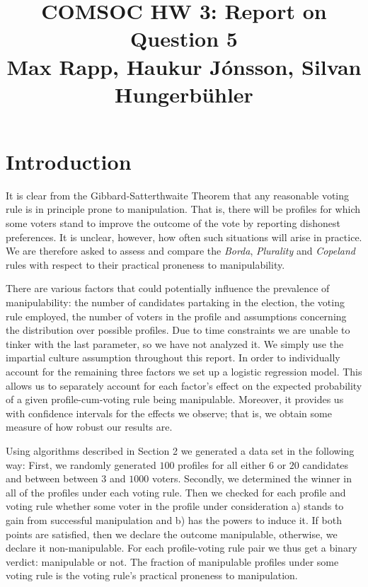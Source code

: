\documentclass[10pt,a4paper]{article}
\title{%
  COMSOC HW 3: Report on Question 5 \\
  \large Max Rapp, Haukur J{\'o}nsson, Silvan Hungerb{\"u}hler}
\date{}
\begin{document}
\maketitle
\section{Introduction}
It is clear from the Gibbard-Satterthwaite Theorem that any reasonable voting rule is in principle prone to manipulation. That is, there will be profiles for which some voters stand to improve the outcome of the vote by reporting dishonest preferences. It is unclear, however, how often such situations will arise in practice. We are therefore asked to assess and compare the \textit{Borda}, \textit{Plurality} and \textit{Copeland} rules with respect to their practical proneness to manipulability.

There are various factors that could potentially influence the prevalence of manipulability: the number of candidates partaking in the election, the voting rule employed, the number of voters in the profile and assumptions concerning the distribution over possible profiles. Due to time constraints we are unable to tinker with the last parameter, so we have not analyzed it. We simply use the impartial culture assumption throughout this report. In order to individually account for the remaining three factors we set up a logistic regression model. This allows us to separately account for each factor's effect on the expected probability of a given profile-cum-voting rule being manipulable. Moreover, it provides us with confidence intervals for the effects we observe; that is, we obtain some measure of how robust our results are. 

Using algorithms described in Section 2 we generated a data set in the following way:
First, we randomly generated $100$ profiles for all either $6$ or $20$ candidates and between between $3$ and $1000$ voters.  Secondly, we determined the winner in all of the profiles under each voting rule. Then we checked for each profile and voting rule whether some voter in the profile under consideration a) stands to gain from successful manipulation and b) has the powers to induce it. If both points are satisfied, then we declare the outcome manipulable, otherwise, we declare it non-manipulable. For each profile-voting rule pair we thus get a binary verdict: manipulable or not. The fraction of manipulable profiles under some voting rule is the voting rule's practical proneness to manipulation.
\end{document}
